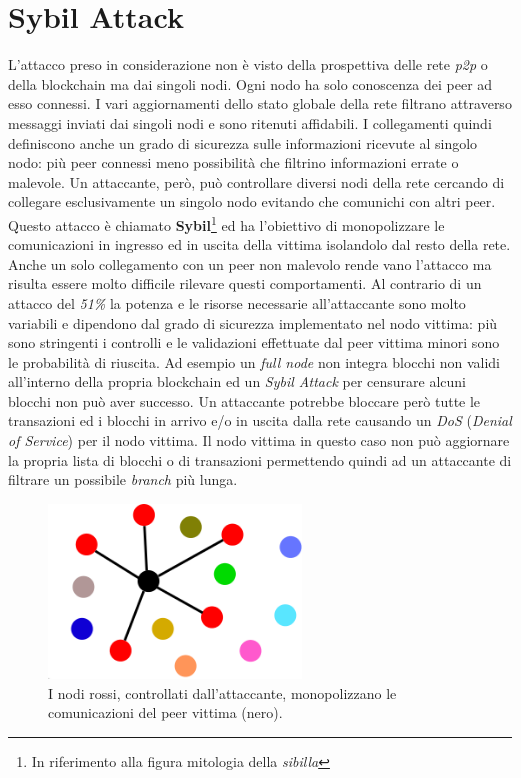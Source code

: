 \section{Sybil Attack}
L'attacco preso in considerazione non è visto della prospettiva delle rete \textit{p2p} o della blockchain ma dai singoli nodi. Ogni nodo ha solo conoscenza dei peer ad esso connessi. I vari aggiornamenti dello stato globale della rete filtrano attraverso messaggi inviati dai singoli nodi e sono ritenuti affidabili.\newline
I collegamenti quindi definiscono anche un grado di sicurezza sulle informazioni ricevute al singolo nodo: più peer connessi meno possibilità che filtrino informazioni errate o malevole. Un attaccante, però, può controllare diversi nodi della rete cercando di collegare esclusivamente un singolo nodo evitando che comunichi con altri peer. Questo attacco è chiamato \textbf{Sybil}\footnote{In riferimento alla figura mitologia della \textit{sibilla}} ed ha l'obiettivo di monopolizzare le comunicazioni in ingresso ed in uscita della vittima isolandolo dal resto della rete. Anche un solo collegamento con un peer non malevolo rende vano l'attacco ma risulta essere molto difficile rilevare questi comportamenti.\newline
Al contrario di un attacco del \textit{51\%} la potenza e le risorse necessarie all'attaccante sono molto variabili e dipendono dal grado di sicurezza implementato nel nodo vittima: più sono stringenti i controlli e le validazioni effettuate dal peer vittima minori sono le probabilità di riuscita. Ad esempio un \textit{full node} non integra blocchi non validi all'interno della propria blockchain ed un \textit{Sybil Attack} per censurare alcuni blocchi non può aver successo. Un attaccante potrebbe bloccare però tutte le transazioni ed i blocchi in arrivo e/o in uscita dalla rete causando un \textit{DoS} (\textit{Denial of Service}) per il nodo vittima. Il nodo vittima in questo caso non può aggiornare la propria lista di blocchi o di transazioni permettendo quindi ad un attaccante di filtrare un possibile \textit{branch} più lunga.\newline
\begin{figure}
    \centering
    \includegraphics[width=0.6\textwidth]{images/sybil.png}
    \caption{I nodi rossi, controllati dall'attaccante, monopolizzano le comunicazioni del peer vittima (nero). \cite{owning}}
\end{figure}

